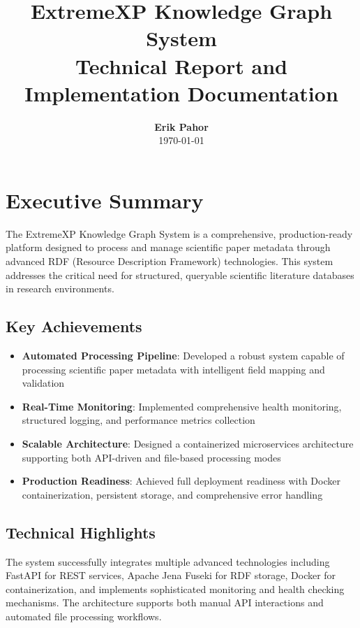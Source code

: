 \documentclass[12pt,a4paper]{article}
\title{
    \vspace{2cm}
    \Huge{\textbf{ExtremeXP Knowledge Graph System}} \\
    \vspace{1cm}
    \large{Technical Report and Implementation Documentation}
}
\author{
    \textbf{Erik Pahor} \\
    \vspace{0.5cm}
    \today
}
\date{}
\begin{document}
\maketitle
\thispagestyle{empty}

\newpage
\tableofcontents
\newpage

\section{Executive Summary}

The ExtremeXP Knowledge Graph System is a comprehensive, production-ready platform designed to process and manage scientific paper metadata through advanced RDF (Resource Description Framework) technologies. This system addresses the critical need for structured, queryable scientific literature databases in research environments.

\subsection{Key Achievements}

\begin{itemize}
    \item \textbf{Automated Processing Pipeline}: Developed a robust system capable of processing scientific paper metadata with intelligent field mapping and validation
    \item \textbf{Real-Time Monitoring}: Implemented comprehensive health monitoring, structured logging, and performance metrics collection
    \item \textbf{Scalable Architecture}: Designed a containerized microservices architecture supporting both API-driven and file-based processing modes
    \item \textbf{Production Readiness}: Achieved full deployment readiness with Docker containerization, persistent storage, and comprehensive error handling
\end{itemize}

\subsection{Technical Highlights}

The system successfully integrates multiple advanced technologies including FastAPI for REST services, Apache Jena Fuseki for RDF storage, Docker for containerization, and implements sophisticated monitoring and health checking mechanisms. The architecture supports both manual API interactions and automated file processing workflows.
\end{document}

